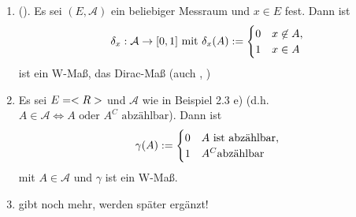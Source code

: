 \begin{example}
	\begin{enumerate}
		\item (). Es sei $(E,\mathcal{A})$ ein beliebiger Messraum und $x \in E$ fest. Dann ist
		\begin{align}
			\delta_x: \mathcal{A} \to [0,1] \text{ mit } \delta_x(A) := \begin{cases}
				0 & x \not \in A,\\
				1 & x \in A
			\end{cases}\notag
		\end{align}
		ist ein W-Maß, das Dirac-Maß (auch , )
		\item Es sei $E=<R>$ und $\mathcal{A}$ wie in Beispiel 2.3 e) %
		(d.h. $A \in \mathcal{A} \Longleftrightarrow A \text{ oder } A^C \text{ abzählbar}$). Dann ist
		\begin{align}
		\gamma(A) := \begin{cases}
		0 & A \text{ ist abzählbar},\\
		1 & A^C \text{abzählbar}
		\end{cases}\notag
		\end{align} mit $A \in \mathcal{A}$ und $\gamma$ ist ein W-Maß.
		\item gibt noch mehr, werden später ergänzt!
	\end{enumerate}
\end{example}